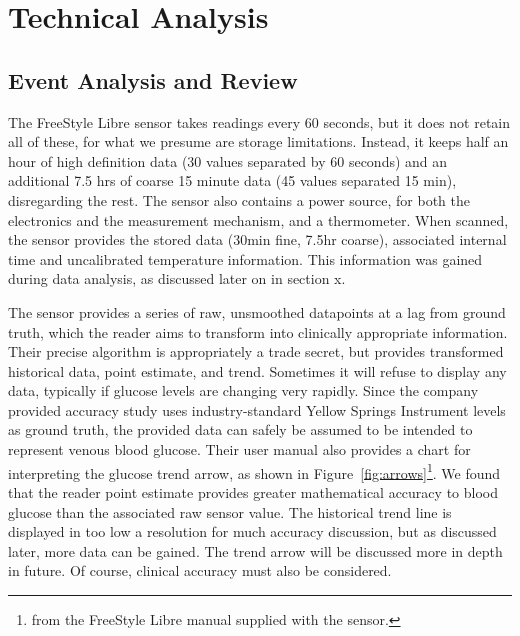\chapter{Technical Analysis}

\section{Event Analysis and Review}

The FreeStyle Libre sensor takes readings every 60 seconds, but it does not retain all of these, for what we presume are storage limitations. Instead, it keeps half an hour of high definition data (30 values separated by 60 seconds) and an additional 7.5 hrs of coarse 15 minute data (45 values separated 15 min), disregarding the rest. The sensor also contains a power source, for both the electronics and the measurement mechanism, and a thermometer. When scanned, the sensor provides the stored data (30min fine, 7.5hr coarse), associated internal time and uncalibrated temperature information. This information was gained during data analysis, as discussed later on in section x.

The sensor provides a series of raw, unsmoothed datapoints at a lag from ground truth, which the reader aims to transform into clinically appropriate information. Their precise algorithm is appropriately a trade secret, but provides transformed historical data, point estimate, and trend. Sometimes it will refuse to display any data, typically if glucose levels are changing very rapidly. Since the company provided accuracy study uses industry-standard Yellow Springs Instrument levels as ground truth, the provided data can safely be assumed to be intended to represent venous blood glucose. Their user manual also provides a chart for interpreting the glucose trend arrow, as shown in Figure~\ref{fig:arrows}\footnote{from the FreeStyle Libre manual supplied with the sensor.}. We found that the reader point estimate provides greater mathematical accuracy to blood glucose than the associated raw sensor value. The historical trend line is displayed in too low a resolution for much accuracy discussion, but as discussed later, more data can be gained. The trend arrow will be discussed more in depth in future. Of course, clinical accuracy must also be considered.

